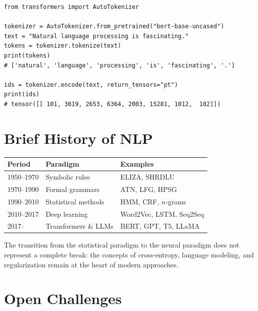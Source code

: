 \begin{codeblock}[title=\textbf{Tokenization with Hugging Face}]
\begin{verbatim}
from transformers import AutoTokenizer

tokenizer = AutoTokenizer.from_pretrained("bert-base-uncased")
text = "Natural language processing is fascinating."
tokens = tokenizer.tokenize(text)
print(tokens)
# ['natural', 'language', 'processing', 'is', 'fascinating', '.']

ids = tokenizer.encode(text, return_tensors="pt")
print(ids)
# tensor([[ 101, 3019, 2653, 6364, 2003, 15281, 1012,  102]])
\end{verbatim}
\end{codeblock}

\section{Brief History of NLP}
\label{sec:intro:history}

\begin{center}
\renewcommand{\arraystretch}{1.2}
\begin{tabular}{lll}
\toprule
\textbf{Period} & \textbf{Paradigm} & \textbf{Examples} \\
\midrule
1950--1970 & Symbolic rules & ELIZA, SHRDLU \\
1970--1990 & Formal grammars & ATN, LFG, HPSG \\
1990--2010 & Statistical methods & HMM, CRF, $n$-grams \\
2010--2017 & Deep learning & Word2Vec, LSTM, Seq2Seq \\
2017--      & Transformers \& LLMs & BERT, GPT, T5, LLaMA \\
\bottomrule
\end{tabular}
\end{center}

\begin{remark}
The transition from the statistical paradigm to the neural paradigm does not
represent a complete break: the concepts of cross-entropy, language modeling,
and regularization remain at the heart of modern approaches.
\end{remark}

\section{Open Challenges}
\label{sec:intro:challenges}

